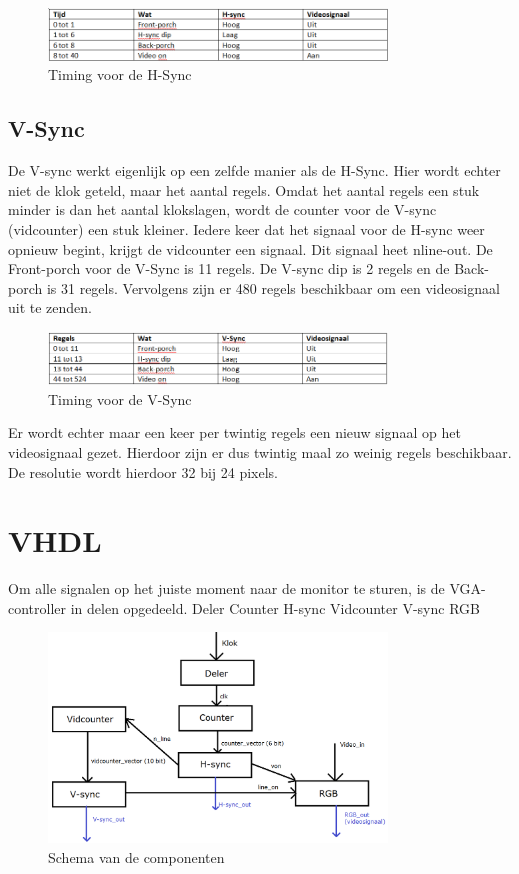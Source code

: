 \documentclass[oneside,dutch]{tudelft-report}
\begin{document}
\begin{figure}[H]
\center
\includegraphics[width=9cm]{tabel-VGA-1}
\caption{Timing voor de H-Sync}
\label{VGA}
\end{figure}

\subsection{V-Sync}
De V-sync werkt eigenlijk op een zelfde manier als de H-Sync. Hier wordt echter niet de klok geteld, maar het aantal regels. Omdat het aantal regels een stuk minder is dan het aantal klokslagen, wordt de counter voor de V-sync (vidcounter) een stuk kleiner. Iedere keer dat het signaal voor de H-sync weer opnieuw begint, krijgt de vidcounter een signaal. Dit signaal heet nline-out. De Front-porch voor de V-Sync is 11 regels. De V-sync dip is 2 regels en de Back-porch is 31 regels. Vervolgens zijn er 480 regels beschikbaar om een videosignaal uit te zenden.

\begin{figure}[H]
\center
\includegraphics[width=9cm]{tabel-VGA-2}
\caption{Timing voor de V-Sync}
\label{VGA}
\end{figure}

Er wordt echter maar een keer per twintig regels een nieuw signaal op het videosignaal gezet. Hierdoor zijn er dus twintig maal zo weinig regels beschikbaar. De resolutie wordt hierdoor 32 bij 24 pixels.

\section{VHDL}
Om alle signalen op het juiste moment naar de monitor te sturen, is de VGA-controller in delen opgedeeld. 
Deler
Counter
H-sync
Vidcounter
V-sync
RGB

\begin{figure}[H]
\center
\includegraphics[width=9cm]{schema-zonder-SRAM}
\caption{Schema van de componenten}
\label{VGA}
\end{figure}
\end{document}
